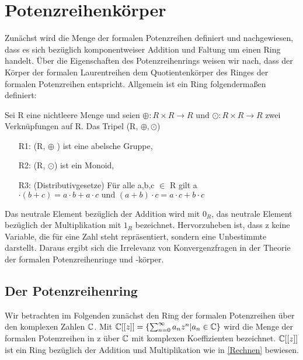 \chapter{Potenzreihenkörper}\label{chap3}
%
Zunächst wird die Menge der formalen Potenzreihen definiert und nachgewiesen, dass es sich bezüglich komponentweiser Addition und Faltung um einen Ring handelt. Über die Eigenschaften des Potenzreihenrings weisen wir nach, dass der Körper der formalen Laurentreihen dem Quotientenkörper des Ringes der formalen Potenzreihen entspricht.
Allgemein ist ein Ring folgendermaßen definiert:
\begin{defn}\label{Ring} %
Sei R eine nichtleere Menge und seien $\oplus: R \times R \to R \text{ und } \odot: R \times R \to R $ zwei Verknüpfungen auf R. Das Tripel (R, $\oplus, \odot$)
%
\begin{enumerate}
\item[R1:] (R, $\oplus$ ) ist eine abelsche Gruppe,
\item[R2:] (R, $\odot$) ist ein Monoid,
\item[R3:] (Distributivgesetze) Für alle a,b,c $\in$ R gilt a $\cdot(b +c) = a \cdot b + a \cdot c \text{ und } (a+b) \cdot c = a \cdot c + b \cdot c $
\end{enumerate}
\end{defn}
Das neutrale Element bezüglich der Addition wird mit $0_R$, das neutrale Element bezüglich der Multiplikation mit $1_R$ bezeichnet.
Hervorzuheben ist, dass z keine Variable, die für eine Zahl steht repräsentiert, sondern eine Unbestimmte darstellt. Daraus ergibt sich die Irrelevanz von Konvergenzfragen in der Theorie der formalen Potenzreihenringe und -körper.
%
\section{Der Potenzreihenring}
Wir betrachten im Folgenden zunächst den Ring der formalen Potenzreihen über den komplexen Zahlen $\mathbb{C}$.
Mit $\mathbb{C} [[z]] = \lbrace \sum_{n=0}^\infty a_n z^n \vert a_n\in \mathbb{C} \rbrace $ wird die Menge der formalen Potenzreihen in z über $\mathbb{C}$ mit komplexen Koeffizienten bezeichnet. $\mathbb{C} [[z]] $ ist ein Ring bezüglich der Addition und Multiplikation wie in \ref{Rechnen} bewiesen. 

